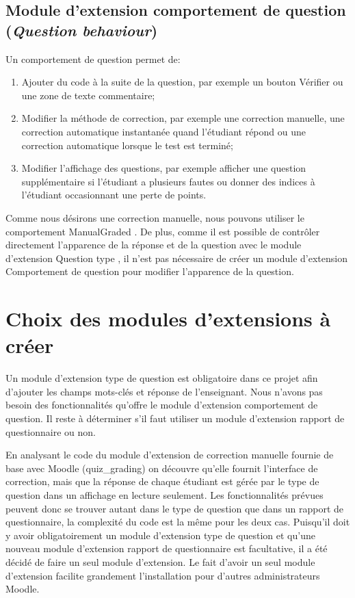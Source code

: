 \subsection{Module d'extension comportement de question (\textit{Question behaviour})}

Un comportement de question permet de:
\begin{enumerate}
  \item Ajouter du code à la suite de la question, par exemple un bouton \og Vérifier \fg{} ou une zone de texte commentaire;
  
  \item Modifier la méthode de correction, par exemple une correction manuelle, une correction automatique instantanée quand l'étudiant répond ou une correction automatique lorsque le test est terminé;
  
  \item Modifier l'affichage des questions, par exemple afficher une question supplémentaire si l'étudiant a plusieurs fautes ou donner des indices à l'étudiant occasionnant une perte de points.
\end{enumerate}

Comme nous désirons une correction manuelle, nous pouvons utiliser le comportement \og ManualGraded \fg{}.
De plus, comme il est possible de contrôler directement l'apparence de la réponse et de la question avec le module d'extension \og Question type \fg{}, il n'est pas nécessaire de créer un module d'extension \og Comportement de question \fg{} pour modifier l'apparence de la question.

\section{Choix des modules d'extensions à créer}

Un module d'extension type de question est obligatoire dans ce projet afin d'ajouter les champs mots-clés et réponse de l'enseignant.
Nous n'avons pas besoin des fonctionnalités qu'offre le module d'extension comportement de question.
Il reste à déterminer s'il faut utiliser un module d'extension rapport de questionnaire ou non.

En analysant le code du module d'extension de correction manuelle fournie de base avec Moodle (quiz\_grading) on découvre qu'elle fournit l'interface de correction, mais que la réponse de chaque étudiant est gérée par le type de question dans un affichage en lecture seulement.
Les fonctionnalités prévues peuvent donc se trouver autant dans le type de question que dans un rapport de questionnaire, la complexité du code est la même pour les deux cas.
Puisqu'il doit y avoir obligatoirement un module d'extension type de question et qu'une nouveau module d'extension rapport de questionnaire est facultative, il a été décidé de faire un seul module d'extension.
Le fait d'avoir un seul module d'extension facilite grandement l'installation pour d'autres administrateurs Moodle.